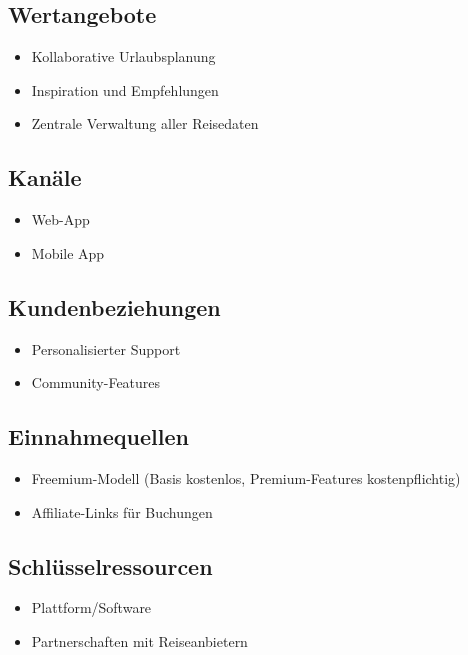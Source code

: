 \documentclass{article}
\begin{document}
\subsection{Wertangebote}\label{wertangebote}

\begin{itemize}
\tightlist
\item
  Kollaborative Urlaubsplanung
\item
  Inspiration und Empfehlungen
\item
  Zentrale Verwaltung aller Reisedaten
\end{itemize}

\subsection{Kanäle}\label{kanuxe4le}

\begin{itemize}
\tightlist
\item
  Web-App
\item
  Mobile App
\end{itemize}

\subsection{Kundenbeziehungen}\label{kundenbeziehungen}

\begin{itemize}
\tightlist
\item
  Personalisierter Support
\item
  Community-Features
\end{itemize}

\subsection{Einnahmequellen}\label{einnahmequellen}

\begin{itemize}
\tightlist
\item
  Freemium-Modell (Basis kostenlos, Premium-Features kostenpflichtig)
\item
  Affiliate-Links für Buchungen
\end{itemize}

\subsection{Schlüsselressourcen}\label{schluxfcsselressourcen}

\begin{itemize}
\tightlist
\item
  Plattform/Software
\item
  Partnerschaften mit Reiseanbietern
\end{itemize}
\end{document}
